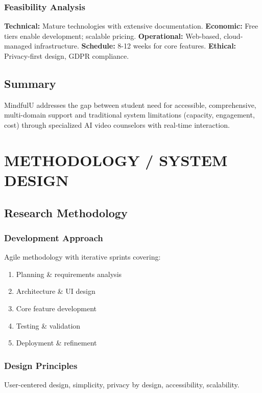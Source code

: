 \documentclass[11pt,a4paper]{report}
\begin{document}
\subsection{Feasibility Analysis}
\textbf{Technical:} Mature technologies with extensive documentation. \textbf{Economic:} Free tiers enable development; scalable pricing. \textbf{Operational:} Web-based, cloud-managed infrastructure. \textbf{Schedule:} 8-12 weeks for core features. \textbf{Ethical:} Privacy-first design, GDPR compliance.

\section{Summary}
MindfulU addresses the gap between student need for accessible, comprehensive, multi-domain support and traditional system limitations (capacity, engagement, cost) through specialized AI video counselors with real-time interaction.

\chapter{METHODOLOGY / SYSTEM DESIGN}

\section{Research Methodology}

\subsection{Development Approach}
Agile methodology with iterative sprints covering:
\begin{enumerate}
    \item Planning \& requirements analysis
    \item Architecture \& UI design
    \item Core feature development
    \item Testing \& validation
    \item Deployment \& refinement
\end{enumerate}

\subsection{Design Principles}
User-centered design, simplicity, privacy by design, accessibility, scalability.
\end{document}
